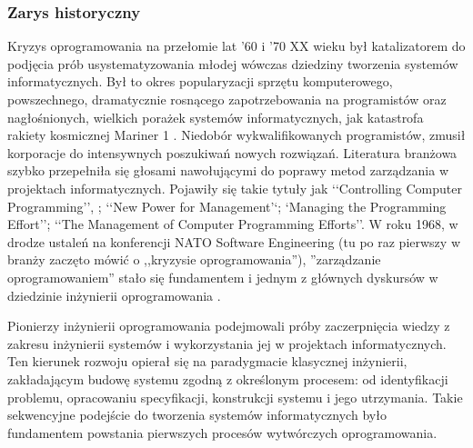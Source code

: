       \subsubsection{Zarys historyczny}

        Kryzys oprogramowania na przełomie lat '60 i '70 XX wieku był katalizatorem do podjęcia prób usystematyzowania młodej wówczas dziedziny tworzenia systemów informatycznych. Był to okres popularyzacji sprzętu komputerowego, powszechnego, dramatycznie rosnącego zapotrzebowania na programistów oraz nagłośnionych, wielkich porażek systemów informatycznych, jak katastrofa rakiety kosmicznej Mariner 1 \cite{Brooks75}. Niedobór wykwalifikowanych programistów, zmusił korporacje do intensywnych poszukiwań nowych rozwiązań. Literatura branżowa szybko przepełniła się głosami nawołującymi do poprawy metod zarządzania w projektach informatycznych. Pojawiły się takie tytuły jak ‘‘Controlling Computer Programming’’, ; ‘‘New Power for Management’‘; ‘Managing the Programming Effort’’; ‘‘The Management of Computer Programming Efforts’’. W roku 1968, w drodze ustaleń na konferencji NATO Software Engineering (tu po raz pierwszy w branży zaczęto mówić o ,,kryzysie oprogramowania''), ''zarządzanie oprogramowaniem'' stało się fundamentem i jednym z głównych dyskursów w dziedzinie inżynierii oprogramowania \cite{Ense03}.
        
        Pionierzy inżynierii oprogramowania podejmowali próby zaczerpnięcia wiedzy z zakresu inżynierii systemów i wykorzystania jej w projektach informatycznych. Ten kierunek rozwoju opierał się na paradygmacie klasycznej inżynierii, zakładającym budowę systemu zgodną z określonym procesem: od identyfikacji problemu, opracowaniu specyfikacji, konstrukcji systemu i jego utrzymania. Takie sekwencyjne podejście do tworzenia systemów informatycznych było fundamentem powstania pierwszych procesów wytwórczych oprogramowania. 
        
